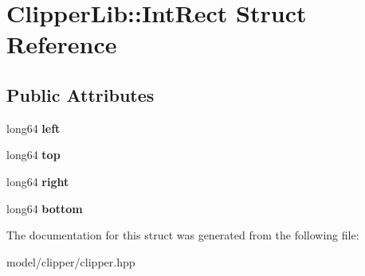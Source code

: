\hypertarget{structClipperLib_1_1IntRect}{\section{Clipper\-Lib\-:\-:Int\-Rect Struct Reference}
\label{structClipperLib_1_1IntRect}
}
\subsection*{Public Attributes}
\begin{DoxyCompactItemize}
\item 
\hypertarget{structClipperLib_1_1IntRect_a11caf77c3b6bde44fbb34107fa61a7a6}{long64 {\bfseries left}}\label{structClipperLib_1_1IntRect_a11caf77c3b6bde44fbb34107fa61a7a6}

\item 
\hypertarget{structClipperLib_1_1IntRect_ac5191ac3521b70bdf6fd7efd1f6ad55a}{long64 {\bfseries top}}\label{structClipperLib_1_1IntRect_ac5191ac3521b70bdf6fd7efd1f6ad55a}

\item 
\hypertarget{structClipperLib_1_1IntRect_a1403c5dd21df5ec2131996682d47ac0c}{long64 {\bfseries right}}\label{structClipperLib_1_1IntRect_a1403c5dd21df5ec2131996682d47ac0c}

\item 
\hypertarget{structClipperLib_1_1IntRect_ae85ebc1e77afcccaabebfead7385c6b8}{long64 {\bfseries bottom}}\label{structClipperLib_1_1IntRect_ae85ebc1e77afcccaabebfead7385c6b8}

\end{DoxyCompactItemize}


The documentation for this struct was generated from the following file\-:\begin{DoxyCompactItemize}
\item 
model/clipper/clipper.\-hpp\end{DoxyCompactItemize}

